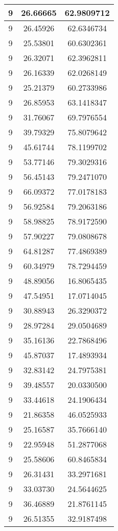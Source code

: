 \documentclass[
]{book}
\begin{document}
\begin{tabular}{c|c|c}
\hline
9 & 26.66665 & 62.9809712\\
\hline
9 & 26.45926 & 62.6346734\\
\hline
9 & 25.53801 & 60.6302361\\
\hline
9 & 26.32071 & 62.3962811\\
\hline
9 & 26.16339 & 62.0268149\\
\hline
9 & 25.21379 & 60.2733986\\
\hline
9 & 26.85953 & 63.1418347\\
\hline
9 & 31.76067 & 69.7976554\\
\hline
9 & 39.79329 & 75.8079642\\
\hline
9 & 45.61744 & 78.1199702\\
\hline
9 & 53.77146 & 79.3029316\\
\hline
9 & 56.45143 & 79.2471070\\
\hline
9 & 66.09372 & 77.0178183\\
\hline
9 & 56.92584 & 79.2063186\\
\hline
9 & 58.98825 & 78.9172590\\
\hline
9 & 57.90227 & 79.0808678\\
\hline
9 & 64.81287 & 77.4869389\\
\hline
9 & 60.34979 & 78.7294459\\
\hline
9 & 48.89056 & 16.8065435\\
\hline
9 & 47.54951 & 17.0714045\\
\hline
9 & 30.88943 & 26.3290372\\
\hline
9 & 28.97284 & 29.0504689\\
\hline
9 & 35.16136 & 22.7868496\\
\hline
9 & 45.87037 & 17.4893934\\
\hline
9 & 32.83142 & 24.7975381\\
\hline
9 & 39.48557 & 20.0330500\\
\hline
9 & 33.44618 & 24.1906434\\
\hline
9 & 21.86358 & 46.0525933\\
\hline
9 & 25.16587 & 35.7666140\\
\hline
9 & 22.95948 & 51.2877068\\
\hline
9 & 25.58606 & 60.8465834\\
\hline
9 & 26.31431 & 33.2971681\\
\hline
9 & 33.03730 & 24.5644625\\
\hline
9 & 36.46889 & 21.8761145\\
\hline
9 & 26.51355 & 32.9187498\\

\end{tabular}
\end{document}
